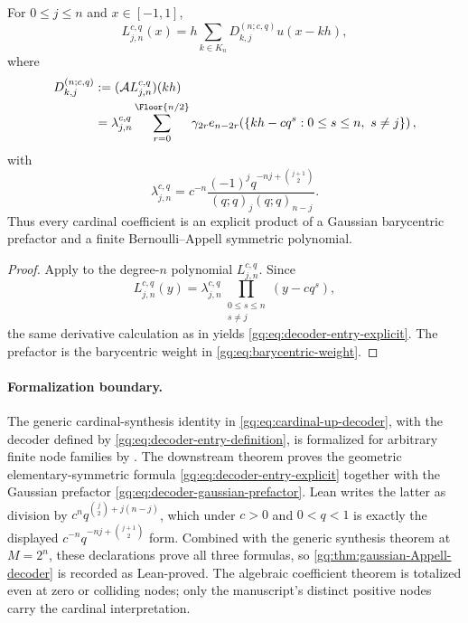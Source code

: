 \begin{theorem}
\label{gq:thm:gaussian-Appell-decoder}
For $0\le j\le n$ and $x\in[-1,1]$,
\begin{equation}
 \boxed{
 L_{j,n}^{c,q}(x)
 =h\sum_{k\in K_n}D_{k,j}^{(n;c,q)}u(x-kh),}
 \label{gq:eq:cardinal-up-decoder}
\end{equation}
where
\begin{align}
 D_{k,j}^{(n;c,q)}
 &:=(\App L_{j,n}^{c,q})(kh)
 \label{gq:eq:decoder-entry-definition}\\
 &=\lambda_{j,n}^{c,q}
   \sum_{r=0}^{\Floor{n/2}}\gamma_{2r}
   e_{n-2r}\!\left(
     \{kh-cq^s:0\le s\le n,\ s\ne j\}\right),
 \label{gq:eq:decoder-entry-explicit}
\end{align}
with
\begin{equation}
 \lambda_{j,n}^{c,q}
 =c^{-n}\frac{(-1)^jq^{-nj+\binom{j+1}{2}}}
 {(q;q)_j(q;q)_{n-j}}.
 \label{gq:eq:decoder-gaussian-prefactor}
\end{equation}
Thus every cardinal coefficient is an explicit product of a Gaussian
barycentric prefactor and a finite Bernoulli--Appell symmetric polynomial.
\end{theorem}

\begin{proof}
Apply  to the degree-$n$ polynomial
$L_{j,n}^{c,q}$.  Since
\[
 L_{j,n}^{c,q}(y)
 =\lambda_{j,n}^{c,q}
  \prod_{\substack{0\le s\le n\\s\ne j}}(y-cq^s),
\]
the same derivative calculation as in
 yields
\eqref{gq:eq:decoder-entry-explicit}.  The prefactor is the barycentric weight in
\eqref{gq:eq:barycentric-weight}.
\end{proof}

\paragraph{Formalization boundary.}
The generic cardinal-synthesis identity in
\eqref{gq:eq:cardinal-up-decoder}, with the decoder defined by
\eqref{gq:eq:decoder-entry-definition}, is formalized for arbitrary finite
node families by
.
The downstream theorem  proves
the geometric elementary-symmetric formula
\eqref{gq:eq:decoder-entry-explicit} together with the Gaussian prefactor
\eqref{gq:eq:decoder-gaussian-prefactor}.  Lean writes the latter as division
by $c^nq^{\binom{j}{2}+j(n-j)}$, which under $c>0$ and $0<q<1$ is exactly
the displayed $c^{-n}q^{-nj+\binom{j+1}{2}}$ form.  Combined with the generic
synthesis theorem at $M=2^n$, these declarations prove all three formulas,
so \cref{gq:thm:gaussian-Appell-decoder} is recorded as Lean-proved.  The
algebraic coefficient theorem is totalized even at zero or colliding nodes;
only the manuscript's distinct positive nodes carry the cardinal
interpretation.

